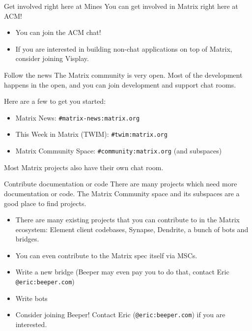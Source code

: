 \documentclass{acm}
\begin{document}
\begin{frame}{Get involved right here at Mines}
    You can get involved in Matrix right here at ACM!

    \begin{itemize}
        \item You can join the ACM chat!
        \item If you are interested in building non-chat applications on top of
            Matrix, consider joining Visplay.
    \end{itemize}
\end{frame}

\begin{frame}{Follow the news}
    The Matrix community is very open. Most of the development happens in the
    open, and you can join development and support chat rooms.

    Here are a few to get you started:
    \begin{itemize}
        \item Matrix News: \texttt{\#matrix-news:matrix.org}
        \item This Week in Matrix (TWIM): \texttt{\#twim:matrix.org}
        \item Matrix Community Space: \texttt{\#community:matrix.org} (and
            subspaces)
    \end{itemize}

    Most Matrix projects also have their own chat room.
\end{frame}

\begin{frame}{Contribute documentation or code}
    There are many projects which need more documentation or code. The Matrix
    Community space and its subspaces are a good place to find projects.
    \begin{itemize}[<+->]
        \item There are many existing projects that you can contribute to in the
            Matrix ecosystem: Element client codebases, Synapse, Dendrite, a
            bunch of bots and bridges.
        \item You can even contribute to the Matrix spec itself via MSCs.
        \item Write a new bridge (Beeper may even pay you to do that, contact
            Eric \texttt{@eric:beeper.com})
        \item Write bots
        \item Consider joining Beeper! Contact Eric (\texttt{@eric:beeper.com})
            if you are interested.
    \end{itemize}
\end{frame}
\end{document}
